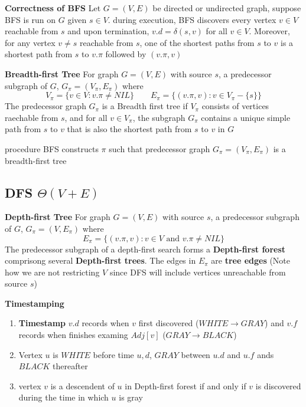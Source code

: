\documentclass[11pt]{article}
\begin{document}
\begin{theorem*}
    \textbf{Correctness of BFS} Let $G = (V,E)$ be directed or undirected graph, suppose BFS is run on $G$ given $s\in V$. during execution, BFS discovers every vertex $v\in V$ reachable from $s$ and upon termination, $v.d = \delta(s,v)$ for all $v\in V$. Moreover, for any vertex $v\neq s$ reachable from $s$, one of the shortest paths from $s$ to $v$ is a shortest path from $s$ to $v.\pi$ followed by $(v.\pi, v)$
\end{theorem*}


\begin{defn*}
    \textbf{Breadth-first Tree} For graph $G = (V,E)$ with source $s$, a predecessor subgraph of $G$, $G_{\pi} = (V_{\pi}, E_{\pi})$ where 
    \[
        V_{\pi} = \{ v\in V: v.\pi \neq NIL\} \quad \quad E_{\pi} = \{ (v.\pi, v): v\in V_{\pi} - \{s\}\}
    \]
    The predecessor graph $G_{\pi}$ is a Breadth first tree if $V_{\pi}$ consists of vertices raechable from $s$, and for all $v\in V_{\pi}$, the subgraph $G_{\pi}$ contains a unique simple path from $s$ to $v$ that is also the shortest path from $s$ to $v$ in $G$
\end{defn*}


\begin{lemma*}
    procedure BFS constructs $\pi$ such that predecessor graph $G_{\pi} = (V_{\pi}, E_{\pi})$ is a breadth-first tree
\end{lemma*}



\subsection*{DFS $\Theta(V+E)$} 

\begin{defn*}
    \textbf{Depth-first Tree} For graph $G = (V,E)$ with source $s$, a predecessor subgraph of $G$, $G_{\pi} = (V, E_{\pi})$ where 
    \[
        E_{\pi} = \{ (v.\pi, v): v\in V \text{ and } v.\pi \neq NIL\}
    \]
    The predecessor subgraph of a depth-first search forms a \textbf{Depth-first forest} comprisong several \textbf{Depth-first trees}. The edges in $E_{\pi}$ are \textbf{tree edges} (Note how we are not restricting $V$ since DFS will include vertices unreachable from source $s$)
\end{defn*}


\begin{proposition*}
    \textbf{Timestamping}
    \begin{enumerate}
        \item \textbf{Timestamp} $v.d$ records when $v$ first discovered ($WHITE\to GRAY$) and $v.f$ records when finishes examing $Adj[v]$ ($GRAY\to BLACK$)
        \item Vertex $u$ is $WHITE$ before time $u,d$, $GRAY$ between $u.d$ and $u.f$ ands $BLACK$ thereafter
        \item vertex $v$ is a descendent of $u$ in Depth-first forest if and only if $v$ is discovered during the time in which $u$ is gray
    \end{enumerate}
\end{proposition*}
\end{document}

